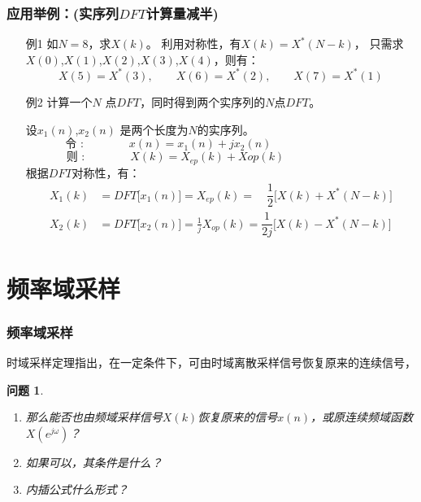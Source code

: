 \documentclass[notheorems,compress,mathserif,table]{beamer}
\newtheorem{wenti}{问题}
\begin{document}
\begin{frame}[allowframebreaks]\frametitle{ 应用举例：(实序列$DFT$计算量减半)}%

      \begin{enumerate}
        \item [例1] 如$N=8$，求$X(k)$。 \quad\newline\newline\quad
              利用对称性，有$X(k)=X^*(N-k)$，\quad\newline\newline\quad
              只需求$X(0)$,$X(1)$,$X(2)$,$X(3)$,$X(4)$，则有：
              $$X(5)=X^*(3),\quad\quad X(6)=X^*(2),\quad\quad X(7)= X^*(1)$$
        \newpage
        \item [例2] 计算一个$N$ 点$DFT$，同时得到两个实序列的$N$点$DFT$。
        
        \quad\newline\quad
              设$x_1(n)$,$x_2(n)$ 是两个长度为$N$的实序列。
              $$\mbox{令 :}\qquad\qquad x(n) = x_1(n)+jx_2(n)\quad\:
              \qquad\qquad\qquad\qquad$$
              $$\mbox{则 :}\qquad\qquad X(k) = X_{ep}(k) +X{op}(k)
              \qquad\qquad\qquad\qquad$$
              根据$DFT$对称性，有：
              \begin{equation*}
                \begin{split}
                X_1(k)  &= DFT\big[x_1(n)\big]   = X_{ep}(k) = \quad \dfrac{1}{2} \bigg[X(k) + X^{*}(N-k)\bigg]  \\
                X_2(k)  &= DFT\big[x_2(n)\big]   = \frac{1}{j}X_{op}(k) = \dfrac{1}{2j}\bigg[X(k) - X^{*}(N-k)\bigg]
                \end{split}
              \end{equation*}
      \end{enumerate}


\end{frame}


\section{频率域采样}
\begin{frame}[shrink]\frametitle{频率域采样}%


时域采样定理指出，在一定条件下，可由时域离散采样信号恢复原来的连续信号，

\begin{wenti}
\begin{enumerate}
	\item 那么能否也由频域采样信号$ X(k) $恢复原来的信号$ x(n) $，或原连续频域函数$ X(e^{j\omega}) $？
	\item 如果可以，其条件是什么？
	\item 内插公式什么形式？
\end{enumerate}
\end{wenti}
\end{frame}
\end{document}
